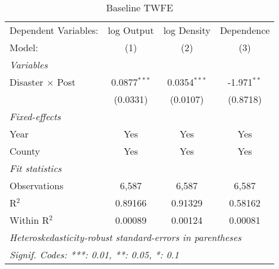 
\begin{table}[htbp]
   \caption{Baseline TWFE}
   \centering
   \begin{adjustbox}{max width = \textwidth, center}
      \begin{tabular}{lccc}
         \tabularnewline \midrule \midrule
         Dependent Variables:    & log Output     & log Density    & Dependence\\  
         Model:                  & (1)            & (2)            & (3)\\  
         \midrule
         \emph{Variables}\\
         Disaster $\times$ Post  & 0.0877$^{***}$ & 0.0354$^{***}$ & -1.971$^{**}$\\   
                                 & (0.0331)       & (0.0107)       & (0.8718)\\   
         \midrule
         \emph{Fixed-effects}\\
         Year                    & Yes            & Yes            & Yes\\  
         County                  & Yes            & Yes            & Yes\\  
         \midrule
         \emph{Fit statistics}\\
         Observations            & 6,587          & 6,587          & 6,587\\  
         R$^2$                   & 0.89166        & 0.91329        & 0.58162\\  
         Within R$^2$            & 0.00089        & 0.00124        & 0.00081\\  
         \midrule \midrule
         \multicolumn{4}{l}{\emph{Heteroskedasticity-robust standard-errors in parentheses}}\\
         \multicolumn{4}{l}{\emph{Signif. Codes: ***: 0.01, **: 0.05, *: 0.1}}\\
      \end{tabular}
   \end{adjustbox}
\end{table}


